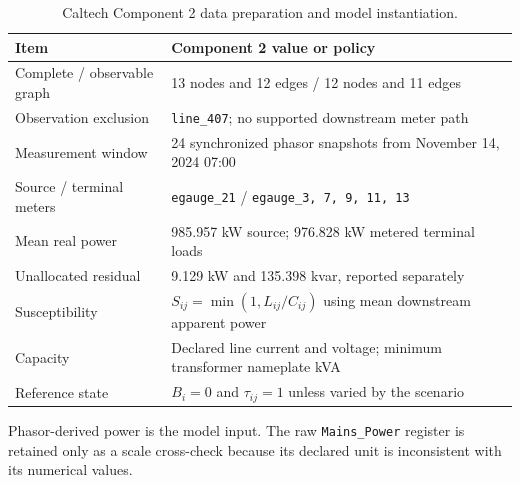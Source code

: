 \begin{table}[H]
\centering
\caption{Caltech Component 2 data preparation and model instantiation.}
\label{tab:electrical-component2-design}
\small
\begin{tabularx}{\textwidth}{@{}lL@{}}
\toprule
Item & Component 2 value or policy \\
\midrule
Complete / observable graph & 13 nodes and 12 edges / 12 nodes and 11 edges \\
Observation exclusion & \texttt{line\_407}; no supported downstream meter path \\
Measurement window & 24 synchronized phasor snapshots from November 14, 2024 07:00 \\
Source / terminal meters & \texttt{egauge\_21} / \texttt{egauge\_3, 7, 9, 11, 13} \\
Mean real power & 985.957 kW source; 976.828 kW metered terminal loads \\
Unallocated residual & 9.129 kW and 135.398 kvar, reported separately \\
Susceptibility & $S_{ij}=\min(1,L_{ij}/C_{ij})$ using mean downstream apparent power \\
Capacity & Declared line current and voltage; minimum transformer nameplate kVA \\
Reference state & $B_i=0$ and $\tau_{ij}=1$ unless varied by the scenario \\
\bottomrule
\end{tabularx}
\vspace{2pt}\parbox{0.96\linewidth}{\footnotesize Phasor-derived power is the model input. The raw \texttt{Mains\_Power} register is retained only as a scale cross-check because its declared unit is inconsistent with its numerical values.}
\end{table}
